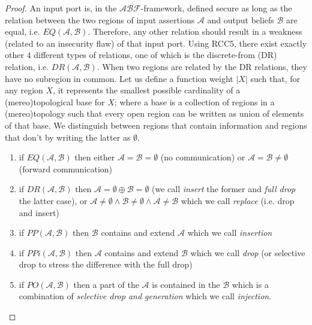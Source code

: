 \documentclass[conference]{IEEEtran}
\newcommand{\assertionRegion}{\mathcal{A}}
\newcommand{\beliefRegion}{\mathcal{B}}
\newcommand{\factRegion}{\mathcal{F}}
\newcommand{\abftheory}{\assertionRegion\beliefRegion\factRegion}
\newcommand{\eq}[2]{EQ(#1,#2)}
\newcommand{\pp}[2]{PP(#1,#2)}
\newcommand{\po}[2]{PO(#1,#2)}
\newcommand{\ppi}[2]{PPi(#1,#2)}
\newcommand{\dr}[2]{DR(#1,#2)}
\begin{document}
\begin{proof}
An input port is, in the $\abftheory$-framework, defined secure as long as the relation
	between the two regions of input assertions $\assertionRegion$ and
	output beliefs $\beliefRegion$ are equal, i.e.
	$\eq{\assertionRegion}{\beliefRegion}$. Therefore, any other relation
	should result in a weakness (related to an insecurity flaw) of that
	input port.  Using RCC5, there exist exactly other $4$ different types
	of relations, one of which is the discrete-from (DR) relation, i.e.
	$\dr{\assertionRegion}{\beliefRegion}$. When two regions are related by
	the DR relations, they have no subregion in common. Let us
	define a function weight $|X|$ such that, for any region $X$, it
	represents the smallest possible cardinality of a (mereo)topological base for
	$X$; where a base is a collection of regions in a (mereo)topology such that
	every open region can be written as union of elements of that base. 
	We distinguish between regions that contain information and regions that
	don't by writing the latter as $\emptyset$.
	\begin{enumerate}
		\item if $\eq{\assertionRegion}{\beliefRegion}$ then either
			$\assertionRegion=\beliefRegion=\emptyset$ (no
			communication) or
			$\assertionRegion=\beliefRegion\neq\emptyset$ (forward
			communication)
		\item if $\dr{\assertionRegion}{\beliefRegion}$ then
			$\assertionRegion=\emptyset\oplus\beliefRegion=\emptyset$
			(we call \emph{insert} the former and \emph{full drop}
			the latter case), or
			$\assertionRegion\neq\emptyset\wedge\beliefRegion\neq\emptyset\wedge\assertionRegion\neq\beliefRegion$
			which we call \emph{replace} (i.e. drop and insert)
		\item if $\pp{\assertionRegion}{\beliefRegion}$ then
			$\beliefRegion$ contains and extend $\assertionRegion$
			which we call \emph{insertion}
		\item if $\ppi{\assertionRegion}{\beliefRegion}$ then
			$\assertionRegion$ contains and extend $\beliefRegion$
			which we call \emph{drop} (or selective drop to stress the difference with the full drop)
		\item if $\po{\assertionRegion}{\beliefRegion}$ then a part of
			the $\assertionRegion$ is contained in the
			$\beliefRegion$ which is a combination of
			\emph{selective drop and generation} which we call \emph{injection}.
	\end{enumerate}
\end{proof}
\end{document}
